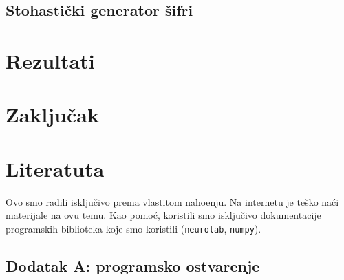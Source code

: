 \documentclass[a4paper,twocolumn,dvipdfm]{article}
\begin{document}
\subsection{Stohasti\v{c}ki generator \v{s}ifri}

\section{Rezultati}

\section{Zaklju\v{c}ak}

\section*{Literatuta}

Ovo smo radili isklju\v{c}ivo prema vlastitom naho\dj enju. Na internetu
je te\v{s}ko na\'ci materijale na ovu temu. Kao pomo\'c, koristili smo
isklju\v{c}ivo dokumentacije programskih biblioteka koje smo koristili
(\texttt{neurolab}, \texttt{numpy}).

\subsection*{Dodatak A: programsko ostvarenje}
\end{document}
